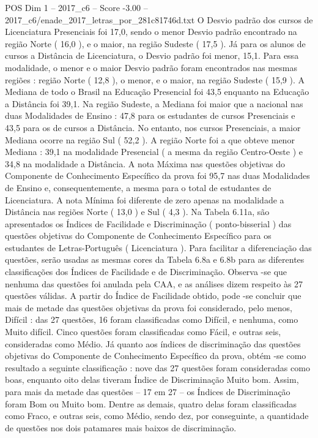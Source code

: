 \begin{textsample}{POS Dim 1 – 2017\_c6 – Score -3.00 – 2017\_c6/enade\_2017\_letras\_por\_281c81746d.txt}
O Desvio padrão dos cursos de Licenciatura Presenciais foi 17,0, sendo o menor Desvio padrão encontrado na região Norte ( 16,0 ), e o maior, na região Sudeste ( 17,5 ).
Já para os alunos de cursos a Distância de Licenciatura, o Desvio padrão foi menor, 15,1.
Para essa modalidade, o menor e o maior Desvio padrão foram encontrados nas mesmas regiões : região Norte ( 12,8 ), o menor, e o maior, na região Sudeste ( 15,9 ).
A Mediana de todo o Brasil na Educação Presencial foi 43,5 enquanto na Educação a Distância foi 39,1.
Na região Sudeste, a Mediana foi maior que a nacional nas duas Modalidades de Ensino : 47,8 para os estudantes de cursos Presenciais e 43,5 para os de cursos a Distância.
No entanto, nos cursos Presenciais, a maior Mediana ocorre na região Sul ( 52,2 ).
A região Norte foi a que obteve menor Mediana : 39,1 na modalidade Presencial ( a mesma da região Centro-Oeste ) e 34,8 na modalidade a Distância.
A nota Máxima nas questões objetivas do Componente de Conhecimento Específico da prova foi 95,7 nas duas Modalidades de Ensino e, consequentemente, a mesma para o total de estudantes de Licenciatura.
A nota Mínima foi diferente de zero apenas na modalidade a Distância nas regiões Norte ( 13,0 ) e Sul ( 4,3 ).
Na Tabela 6.11a, são apresentados os Índices de Facilidade e Discriminação ( ponto-bisserial ) das questões objetivas do Componente de Conhecimento Específico para os estudantes de Letras-Português ( Licenciatura ).
Para facilitar a diferenciação das questões, serão usadas as mesmas cores da Tabela 6.8a e 6.8b para as diferentes classificações dos Índices de Facilidade e de Discriminação.
Observa -se que nenhuma das questões foi anulada pela CAA, e as análises dizem respeito às 27 questões válidas.
A partir do Índice de Facilidade obtido, pode -se concluir que mais de metade das questões objetivas da prova foi considerado, pelo menos, Difícil : das 27 questões, 16 foram classificadas como Difícil, e nenhuma, como Muito difícil.
Cinco questões foram classificadas como Fácil, e outras seis, consideradas como Médio.
Já quanto aos índices de discriminação das questões objetivas do Componente de Conhecimento Específico da prova, obtém -se como resultado a seguinte classificação : nove das 27 questões foram consideradas como boas, enquanto oito delas tiveram Índice de Discriminação Muito bom.
Assim, para mais da metade das questões – 17 em 27 – os Índices de Discriminação foram Bom ou Muito bom.
Dentre as demais, quatro delas foram classificadas como Fraco, e outras seis, como Médio, sendo dez, por conseguinte, a quantidade de questões nos dois patamares mais baixos de discriminação.

\end{textsample}
